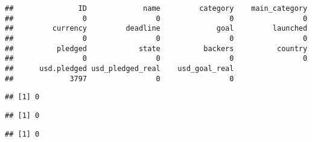 \documentclass[]{article}
\newenvironment{Shaded}{\begin{snugshade}}{\end{snugshade}}
\newcommand{\KeywordTok}[1]{\textcolor[rgb]{0.13,0.29,0.53}{\textbf{#1}}}
\newcommand{\CommentTok}[1]{\textcolor[rgb]{0.56,0.35,0.01}{\textit{#1}}}
\newcommand{\OperatorTok}[1]{\textcolor[rgb]{0.81,0.36,0.00}{\textbf{#1}}}
\newcommand{\NormalTok}[1]{#1}
\begin{document}
\begin{verbatim}
##               ID             name         category    main_category 
##                0                0                0                0 
##         currency         deadline             goal         launched 
##                0                0                0                0 
##          pledged            state          backers          country 
##                0                0                0                0 
##      usd.pledged usd_pledged_real    usd_goal_real 
##             3797                0                0
\end{verbatim}

\begin{Shaded}
\end{Shaded}

\begin{verbatim}
## [1] 0
\end{verbatim}

\begin{Shaded}
\end{Shaded}

\begin{verbatim}
## [1] 0
\end{verbatim}

\begin{Shaded}
\end{Shaded}

\begin{verbatim}
## [1] 0
\end{verbatim}

\begin{Shaded}
\end{Shaded}
\end{document}
